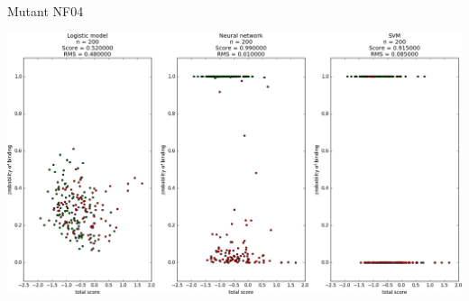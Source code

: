 \documentclass{beamer}
\begin{document}
\begin{frame}{Mutant NF04}
    \begin{center}
    \includegraphics[scale = 0.23]{NF04_classif.png}
    \end{center}
\end{frame}
\end{document}
